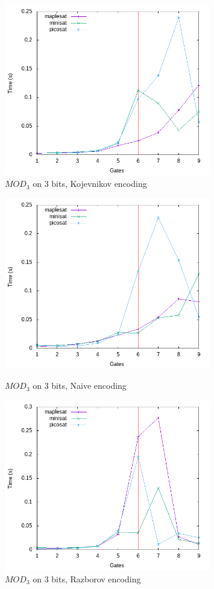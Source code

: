 \documentclass{article}
\begin{document}
\begin{figure}[h!]
  \centering
  \includegraphics[width=0.8\textwidth]{images/times/3mod3_kulikov.png}  
  \caption{$MOD_3$ on 3 bits, Kojevnikov encoding}
\end{figure}
\begin{figure}[h!]
\centering
  \includegraphics[width=0.8\textwidth]{images/times/3mod3_naive.png}  
  \caption{$MOD_3$ on 3 bits, Naive encoding}
  \includegraphics[width=0.8\textwidth]{images/times/3mod3_raz.png}  
  \caption{$MOD_3$ on 3 bits, Razborov encoding}
\end{figure}
\end{document}
